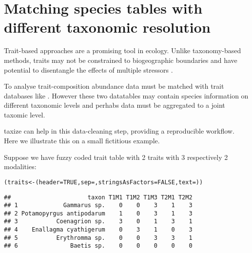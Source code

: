 \section{Matching species tables with different taxonomic resolution} 

Trait-based approaches are a promising tool in ecology. Unlike taxonomy-based methods, traits may not be constrained to biogeographic boundaries \citep{baird_toward_2011} and have potential to disentangle the effects of multiple stressors \citep{statzner_can_2010}. 

To analyse trait-composition abundance data must be matched with trait databases like \citet{usseglio-polatera_biological_2000}. However these two datatables may contain species information on different taxonomic levels and perhabs data must be aggregated to a joint taxomic level.

taxize can help in this data-cleaning step, providing a reproducible workflow. Here we illustrate this on a small fictitious example.

Suppose we have fuzzy coded trait table with 2 traits with 3 respectively 2 modalities:
\begin{knitrout}
\color{fgcolor}\begin{kframe}
\begin{alltt}
(traits <- (header = TRUE, sep = , stringsAsFactors = FALSE, text = ))
\end{alltt}
\begin{verbatim}
##                      taxon T1M1 T1M2 T1M3 T2M1 T2M2
## 1             Gammarus sp.    0    0    3    1    3
## 2 Potamopyrgus antipodarum    1    0    3    1    3
## 3           Coenagrion sp.    3    0    1    3    1
## 4    Enallagma cyathigerum    0    3    1    0    3
## 5           Erythromma sp.    0    0    3    3    1
## 6               Baetis sp.    0    0    0    0    0
\end{verbatim}
\end{kframe}
\end{knitrout}


